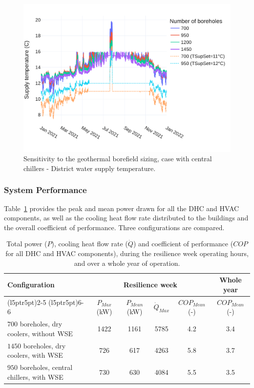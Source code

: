 \begin{figure}[!htbp]
    \centering
    \includegraphics[width=.7\linewidth]{../python_scripts/figures/GeoSizing_chillers.pdf}
    \caption{Sensitivity to the geothermal borefield sizing, case with central chillers - District water supply temperature.}
    \label{fig:chillers_tsup}
\end{figure}




\subsubsection{System Performance} \label{sec:performance}

Table~\ref{tab:performance} provides the peak and mean power drawn for all the DHC and HVAC components, as well as the cooling heat flow rate distributed to the buildings and the overall coefficient of performance.
Three configurations are compared.


\begin{table}[!htbp]
    \caption{Total power ($P$), cooling heat flow rate ($\dot{Q}$) and coefficient of performance ($COP$ for all DHC and HVAC components), during the resilience week operating hours, and over a whole year of operation.}\label{tab:performance}
    \centering
    \begin{tabular}{p{4.5cm}ccccc}
        \toprule
        \multirow{3}{*}{Configuration} & \multicolumn{4}{c}{Resilience week} & Whole year \\
        \cmidrule(l{5pt}r{5pt}){2-5} \cmidrule(l{5pt}r{5pt}){6-6}
        & $P_{Max}$ (kW) & $P_{Mean}$ (kW) & $\dot{Q}_{Max}$ & $COP_{Mean}$ (-) & $COP_{Mean}$ (-)\\
        \midrule
        $700$ boreholes, dry coolers, without WSE & 1422 & 1161 & 5785 & 4.2 & 3.4 \\
        $1450$ boreholes, dry coolers, with WSE & 726 & 617 & 4263 & 5.8 & 3.7 \\
        $950$ boreholes, central chillers, with WSE & 730 & 630 & 4084 & 5.5 & 3.5 \\
        \bottomrule
    \end{tabular}
\end{table}


